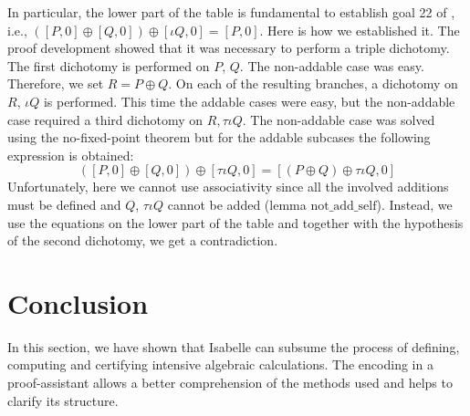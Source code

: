 \documentclass{llncs}
\begin{document}
In particular, the lower part of the table is fundamental to establish
goal 22 of \cite{hales2016group}, i.e., $([P,0] \oplus [Q,0]) \oplus
[\iota Q,0] = [P,0]$. Here is how we established it. The proof development
showed that it was necessary to perform a triple dichotomy. The first
dichotomy is performed on $P$, $Q$. The non-addable case was
easy. Therefore, we set $R = P \oplus Q$. On each of the resulting
branches, a dichotomy on $R$, $\iota Q$ is performed. This time the addable
cases were easy, but the non-addable case required a third dichotomy
on $R,\tau \iota Q$. The non-addable case was solved using the
no-fixed-point theorem but for the addable subcases the following
expression is obtained: $$([P,0] \oplus [Q,0]) \oplus [\tau \iota Q,0] =
[(P \oplus Q) \oplus \tau \iota Q,0]$$ Unfortunately, here we cannot use
associativity since all the involved additions must be defined and
$Q$, $\tau \iota Q$ cannot be added (lemma
$\text{not\_add\_self}$). Instead, we use the equations on the lower
part of the table and together with the hypothesis of the second
dichotomy, we get a contradiction.

\section{Conclusion}


In this section, we have shown that Isabelle can subsume the process
of defining, computing and certifying intensive algebraic
calculations. The encoding in a proof-assistant allows a better
comprehension of the methods used and helps to clarify its structure.


\newpage


 

\end{document}
